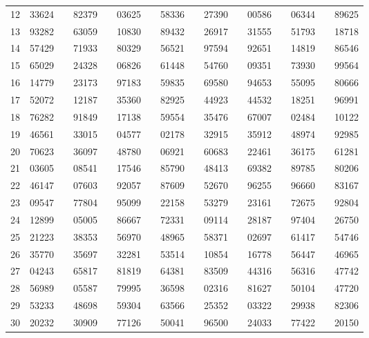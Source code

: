 \begin{center}
\begin{tabular}{cccc cccc cccc cccc}
12 & 33624 & \quad & 82379 & \quad & 03625 & \quad & 58336 & \quad & 27390 & \quad & 00586 & \quad & 06344 & \quad & 89625 \\
13 & 93282 & \quad & 63059 & \quad & 10830 & \quad & 89432 & \quad & 26917 & \quad & 31555 & \quad & 51793 & \quad & 18718 \\
14 & 57429 & \quad & 71933 & \quad & 80329 & \quad & 56521 & \quad & 97594 & \quad & 92651 & \quad & 14819 & \quad & 86546 \\
15 & 65029 & \quad & 24328 & \quad & 06826 & \quad & 61448 & \quad & 54760 & \quad & 09351 & \quad & 73930 & \quad & 99564 \\
\hline
16 & 14779 & \quad & 23173 & \quad & 97183 & \quad & 59835 & \quad & 69580 & \quad & 94653 & \quad & 55095 & \quad & 80666 \\
17 & 52072 & \quad & 12187 & \quad & 35360 & \quad & 82925 & \quad & 44923 & \quad & 44532 & \quad & 18251 & \quad & 96991 \\
18 & 76282 & \quad & 91849 & \quad & 17138 & \quad & 59554 & \quad & 35476 & \quad & 67007 & \quad & 02484 & \quad & 10122 \\
19 & 46561 & \quad & 33015 & \quad & 04577 & \quad & 02178 & \quad & 32915 & \quad & 35912 & \quad & 48974 & \quad & 92985 \\
20 & 70623 & \quad & 36097 & \quad & 48780 & \quad & 06921 & \quad & 60683 & \quad & 22461 & \quad & 36175 & \quad & 61281 \\
\hline
21 & 03605 & \quad & 08541 & \quad & 17546 & \quad & 85790 & \quad & 48413 & \quad & 69382 & \quad & 89785 & \quad & 80206 \\
22 & 46147 & \quad & 07603 & \quad & 92057 & \quad & 87609 & \quad & 52670 & \quad & 96255 & \quad & 96660 & \quad & 83167 \\
23 & 09547 & \quad & 77804 & \quad & 95099 & \quad & 22158 & \quad & 53279 & \quad & 23161 & \quad & 72675 & \quad & 92804 \\
24 & 12899 & \quad & 05005 & \quad & 86667 & \quad & 72331 & \quad & 09114 & \quad & 28187 & \quad & 97404 & \quad & 26750 \\
25 & 21223 & \quad & 38353 & \quad & 56970 & \quad & 48965 & \quad & 58371 & \quad & 02697 & \quad & 61417 & \quad & 54746 \\
\hline
26 & 35770 & \quad & 35697 & \quad & 32281 & \quad & 53514 & \quad & 10854 & \quad & 16778 & \quad & 56447 & \quad & 46965 \\
27 & 04243 & \quad & 65817 & \quad & 81819 & \quad & 64381 & \quad & 83509 & \quad & 44316 & \quad & 56316 & \quad & 47742 \\
28 & 56989 & \quad & 05587 & \quad & 79995 & \quad & 36598 & \quad & 02316 & \quad & 81627 & \quad & 50104 & \quad & 47720 \\
29 & 53233 & \quad & 48698 & \quad & 59304 & \quad & 63566 & \quad & 25352 & \quad & 03322 & \quad & 29938 & \quad & 82306 \\
30 & 20232 & \quad & 30909 & \quad & 77126 & \quad & 50041 & \quad & 96500 & \quad & 24033 & \quad & 77422 & \quad & 20150 \\
\hline
\end{tabular}
\end{center}
